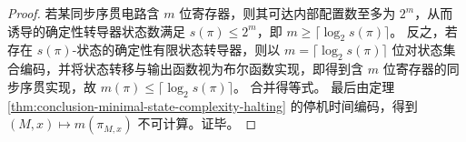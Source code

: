 \begin{proof}
若某同步序贯电路含 \(m\) 位寄存器，则其可达内部配置数至多为 \(2^m\)，从而诱导的确定性转导器状态数满足 \(s(\pi)\le 2^m\)，即 \(m\ge\lceil\log_2 s(\pi)\rceil\)。
反之，若存在 \(s(\pi)\)-状态的确定性有限状态转导器，则以 \(m=\lceil\log_2 s(\pi)\rceil\) 位对状态集合编码，并将状态转移与输出函数视为布尔函数实现，即得到含 \(m\) 位寄存器的同步序贯实现，故 \(m(\pi)\le\lceil\log_2 s(\pi)\rceil\)。
合并得等式。
最后由定理 \ref{thm:conclusion-minimal-state-complexity-halting} 的停机时间编码，得到 \((M,x)\mapsto m(\pi_{M,x})\) 不可计算。证毕。
\end{proof}
